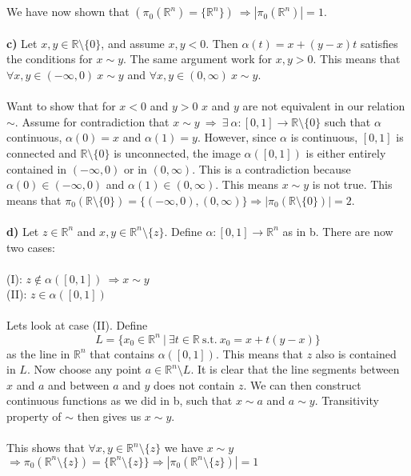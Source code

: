 \documentclass[11pt,a4paper]{report}
\begin{document}
\\
\\
We have now shown that $(\pi_0(\mathbb{R}^n)= \{\mathbb{R}^n\}) \ \Rightarrow |\pi_0(\mathbb{R}^n)|=1$. 
\\
\\
\textbf{c)} Let $x,y \in \mathbb{R} \setminus \{0\}$, and assume $x,y<0$. Then $\alpha(t)=x+(y-x)t$ satisfies the conditions for $x \sim y$. The same argument work for $x,y>0$. This means that \\$\forall x,y \in (-\infty,0) \ x \sim y$ and $\forall x,y \in (0,\infty) \ x \sim y$.
\\
\\
Want to show that for $x<0$ and $y>0$ $x$ and $y$ are not equivalent in our relation $\sim$. Assume for contradiction that $x\sim y \ \Rightarrow \ \exists \ \alpha:[0,1]\rightarrow \mathbb{R} \setminus \{0\}$ such that $\alpha$ continuous, $\alpha(0)=x$ and  $\alpha(1)=y$. However, since $\alpha$ is continuous, $[0,1]$ is connected and $\mathbb{R} \setminus \{0\}$ is unconnected, the image $\alpha([0,1])$ is either entirely contained in $(-\infty,0)$ or in $(0,\infty)$. This is a contradiction because $\alpha(0) \in (-\infty,0)$ and $\alpha(1) \in (0,\infty)$. This means $x \sim y$ is not true. This means that $\pi_0(\mathbb{R} \setminus \{0\})=\{(-\infty,0),(0,\infty)\} \Rightarrow |\pi_0(\mathbb{R} \setminus \{0\})|=2$.
\\
\\
\textbf{d)} Let $z \in \mathbb{R}^n$ and $x,y \in \mathbb{R}^n \setminus \{ z \}$. Define $\alpha:[0,1]\rightarrow \mathbb{R}^n$ as in b. There are now two cases:
\\
\\
(I): $z \notin \alpha([0,1]) \ \Rightarrow x \sim y$ 
\\
(II): $z \in \alpha([0,1])$ 
\\
\\
Lets look at case (II). Define $$L= \{x_0 \in \mathbb{R}^n \ | \ \exists t \in \mathbb{R} \ \text{s.t.} \ x_0=x+t(y-x) \}$$ as the line in $\mathbb{R}^n$ that contains $\alpha([0,1])$. This means that $z$ also is contained in $L$. Now choose any point $a \in \mathbb{R}^n \setminus L$. It is clear that the line segments between $x$ and $a$ and between $a$ and $y$ does not contain $z$. We can then construct continuous functions as we did in b, such that $x \sim a$ and $a \sim y$. Transitivity property of $\sim$ then gives us $x \sim y$. 
\\
\\
This shows that $\forall x,y \in  \mathbb{R}^n \setminus \{ z \}$ we have $ x \sim y$ \\ $ \Rightarrow \pi_0(\mathbb{R}^n \setminus \{ z \})= \{\mathbb{R}^n \setminus \{ z \} \} \Rightarrow |\pi_0(\mathbb{R}^n \setminus \{ z \})|=1$ 
\end{document}
